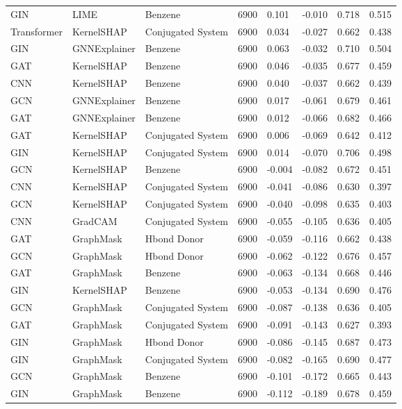 \begin{table}
\begin{tabular}{lllrllll}
GIN & LIME & Benzene & 6900 & 0.101 & -0.010 & 0.718 & 0.515 \\
Transformer & KernelSHAP & Conjugated System & 6900 & 0.034 & -0.027 & 0.662 & 0.438 \\
GIN & GNNExplainer & Benzene & 6900 & 0.063 & -0.032 & 0.710 & 0.504 \\
GAT & KernelSHAP & Benzene & 6900 & 0.046 & -0.035 & 0.677 & 0.459 \\
CNN & KernelSHAP & Benzene & 6900 & 0.040 & -0.037 & 0.662 & 0.439 \\
GCN & GNNExplainer & Benzene & 6900 & 0.017 & -0.061 & 0.679 & 0.461 \\
GAT & GNNExplainer & Benzene & 6900 & 0.012 & -0.066 & 0.682 & 0.466 \\
GAT & KernelSHAP & Conjugated System & 6900 & 0.006 & -0.069 & 0.642 & 0.412 \\
GIN & KernelSHAP & Conjugated System & 6900 & 0.014 & -0.070 & 0.706 & 0.498 \\
GCN & KernelSHAP & Benzene & 6900 & -0.004 & -0.082 & 0.672 & 0.451 \\
CNN & KernelSHAP & Conjugated System & 6900 & -0.041 & -0.086 & 0.630 & 0.397 \\
GCN & KernelSHAP & Conjugated System & 6900 & -0.040 & -0.098 & 0.635 & 0.403 \\
CNN & GradCAM & Conjugated System & 6900 & -0.055 & -0.105 & 0.636 & 0.405 \\
GAT & GraphMask & Hbond Donor & 6900 & -0.059 & -0.116 & 0.662 & 0.438 \\
GCN & GraphMask & Hbond Donor & 6900 & -0.062 & -0.122 & 0.676 & 0.457 \\
GAT & GraphMask & Benzene & 6900 & -0.063 & -0.134 & 0.668 & 0.446 \\
GIN & KernelSHAP & Benzene & 6900 & -0.053 & -0.134 & 0.690 & 0.476 \\
GCN & GraphMask & Conjugated System & 6900 & -0.087 & -0.138 & 0.636 & 0.405 \\
GAT & GraphMask & Conjugated System & 6900 & -0.091 & -0.143 & 0.627 & 0.393 \\
GIN & GraphMask & Hbond Donor & 6900 & -0.086 & -0.145 & 0.687 & 0.473 \\
GIN & GraphMask & Conjugated System & 6900 & -0.082 & -0.165 & 0.690 & 0.477 \\
GCN & GraphMask & Benzene & 6900 & -0.101 & -0.172 & 0.665 & 0.443 \\
GIN & GraphMask & Benzene & 6900 & -0.112 & -0.189 & 0.678 & 0.459 \\
\bottomrule
\end{tabular}
\end{table}
